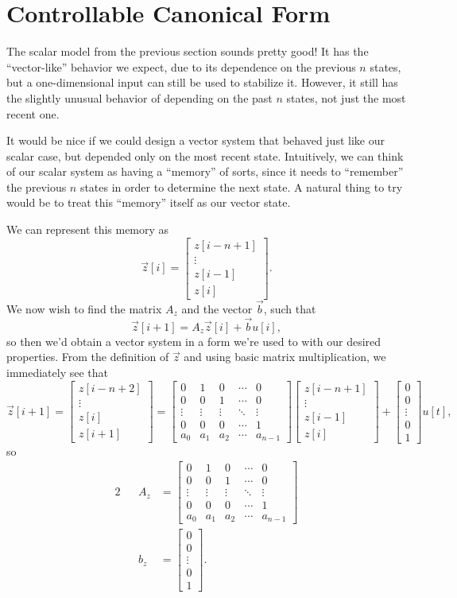 \documentclass[letterpaper]{article}
\theoremstyle{remark}
\newcommand{\mat}[1]{\ensuremath{\begin{bmatrix}#1\end{bmatrix}}}
\newcommand{\eqn}[1]{\begin{alignat*}{2}#1\end{alignat*}}
\begin{document}
\section{Controllable Canonical Form}
The scalar model from the previous section sounds pretty good! It has the ``vector-like'' behavior we expect, due to its dependence on the previous $n$ states, but a one-dimensional input can still be used to stabilize it. However, it still has the slightly unusual behavior of depending on the past $n$ states, not just the most recent one.

It would be nice if we could design a vector system that behaved just like our scalar case, but depended only on the most recent state. Intuitively, we can think of our scalar system as having a ``memory'' of sorts, since it needs to ``remember'' the previous $n$ states in order to determine the next state. A natural thing to try would be to treat this ``memory'' itself as our vector state. 

We can represent this memory as
\[
    \vec{z}[i] = \mat{z[i - n + 1] \\ \vdots \\ z[i - 1] \\ z[i]}.
\]
We now wish to find the matrix $A_z$ and the vector $\vec{b}$, such that
\[
    \vec{z}[i + 1] = A_z \vec{z}[i] + \vec{b}u[i],
\]
so then we'd obtain a vector system in a form we're used to with our desired properties. From the definition of $\vec{z}$ and using basic matrix multiplication, we immediately see that
\[
    \vec{z}[i + 1] = \mat{z[i - n + 2] \\ \vdots \\ z[i] \\ z[i + 1]} = 
    \mat{
    0 & 1 & 0 & \cdots & 0 \\ 
    0 & 0 & 1 & \cdots & 0 \\
    \vdots & \vdots & \vdots & \ddots & \vdots \\
    0 & 0 & 0 & \cdots & 1 \\
    a_0 & a_1 & a_2 & \cdots & a_{n - 1}
    } \mat{z[i - n + 1] \\ \vdots \\ z[i - 1] \\ z[i]} + \mat{0 \\ 0 \\ \vdots \\ 0 \\ 1}u[t],
\]
so
\eqn{
    && A_z &= \mat{
    0 & 1 & 0 & \cdots & 0 \\ 
    0 & 0 & 1 & \cdots & 0 \\
    \vdots & \vdots & \vdots & \ddots & \vdots \\
    0 & 0 & 0 & \cdots & 1 \\
    a_0 & a_1 & a_2 & \cdots & a_{n - 1}
    } \\
    && b_z &= \mat{0 \\ 0 \\ \vdots \\ 0 \\ 1}.
}
\end{document}
